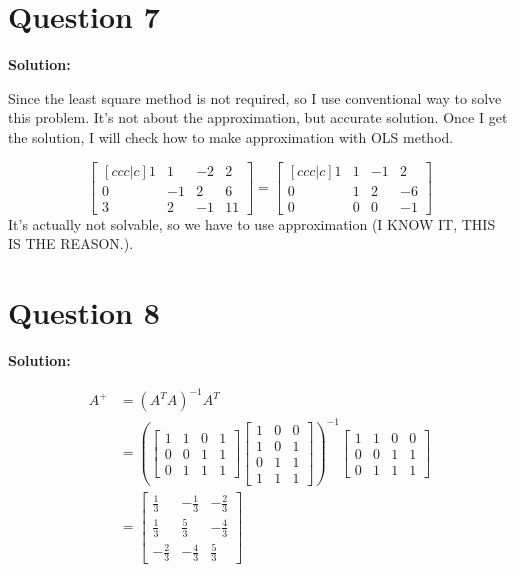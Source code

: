 \documentclass[11pt]{article} %
\begin{document}
\begin{enumerate}
\section{Question 7}
\textbf{Solution:}

Since the least square method is not required, so I use conventional way to solve this problem. It's not about the approximation, but accurate solution. Once I get the solution, I will check how to make approximation with OLS method. 

$$\begin{bmatrix}[ccc|c]
	1&1&-2&2\\
	0&-1&2&6\\
	3&2&-1&11
\end{bmatrix}=\begin{bmatrix}[ccc|c]
1&1&-1&2\\
0&1&2&-6\\
0&0&0&-1
\end{bmatrix}$$
It's actually not solvable, so we have to use approximation (I KNOW IT, THIS IS THE REASON.).

\section{Question 8}
\textbf{Solution:}

\begin{align*}
	A^+&=(A^{T}A)^{-1}A^{T}\\
	&=(\begin{bmatrix}
		1&1&0&1\\
		0&0&1&1\\
		0&1&1&1
	\end{bmatrix}\begin{bmatrix}
	1&0&0\\
	1&0&1\\
	0&1&1\\
	1&1&1
\end{bmatrix})^{-1}\begin{bmatrix}
1&1&0&0\\
0&0&1&1\\
0&1&1&1
\end{bmatrix}\\
&=\begin{bmatrix}
	\frac{1}{3}&-\frac{1}{3}&-\frac{2}{3}\\
	\frac{1}{3}&\frac{5}{3}&-\frac{4}{3}\\
	-\frac{2}{3}&-\frac{4}{3}&\frac{5}{3}
\end{bmatrix}
\end{align*}



\end{enumerate}
\end{document}
